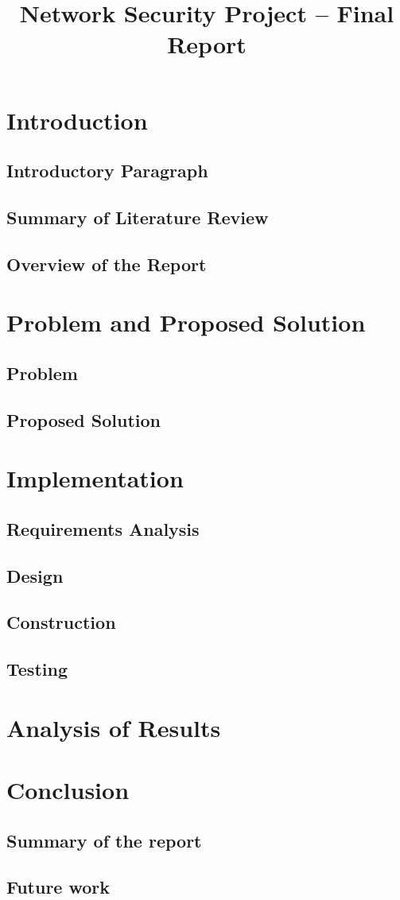 \documentclass{article}
\title{Network Security Project -- Final Report}
\begin{document}
\maketitle
\tableofcontents

\section{Introduction}

\subsection{Introductory Paragraph}
	\subsection{Summary of Literature Review}
	\subsection{Overview of the Report}

\section{Problem and Proposed Solution}
	\subsection{Problem}
	\subsection{Proposed Solution}

\section{Implementation}
	\subsection{Requirements Analysis}
	\subsection{Design}
	\subsection{Construction}
	\subsection{Testing}

\section{Analysis of Results}
\section{Conclusion}
	\subsection{Summary of the report}
	\subsection{Future work}

\newpage
\printbibliography
\end{document}
